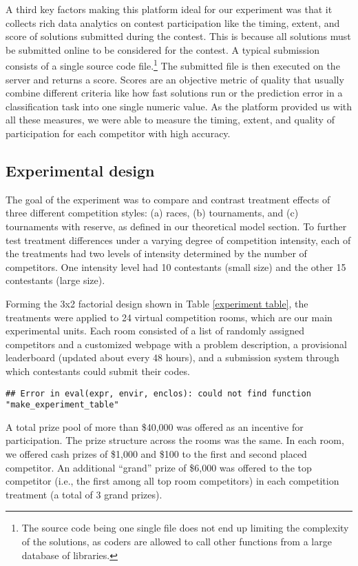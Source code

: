 \documentclass[11pt, titlepage]{article}
\begin{document}
A third key factors making this platform ideal for our experiment was
that it collects rich data analytics on contest participation like the
timing, extent, and score of solutions submitted during the contest.
This is because all solutions must be submitted online to be considered
for the contest. A typical submission consists of a single source code
file.\footnote{The source code being one single file does not end up
  limiting the complexity of the solutions, as coders are allowed to
  call other functions from a large database of libraries.} The
submitted file is then executed on the server and returns a score.
Scores are an objective metric of quality that usually combine different
criteria like how fast solutions run or the prediction error in a
classification task into one single numeric value. As the platform
provided us with all these measures, we were able to measure the timing,
extent, and quality of participation for each competitor with high
accuracy.

\subsection{Experimental design}\label{experimental-design}

The goal of the experiment was to compare and contrast treatment effects
of three different competition styles: (a) races, (b) tournaments, and
(c) tournaments with reserve, as defined in our theoretical model
section. To further test treatment differences under a varying degree of
competition intensity, each of the treatments had two levels of
intensity determined by the number of competitors. One intensity level
had 10 contestants (small size) and the other 15 contestants (large
size).

Forming the 3x2 factorial design shown in Table \ref{experiment table},
the treatments were applied to 24 virtual competition rooms, which are
our main experimental units. Each room consisted of a list of randomly
assigned competitors and a customized webpage with a problem
description, a provisional leaderboard (updated about every 48 hours),
and a submission system through which contestants could submit their
codes.

\begin{verbatim}
## Error in eval(expr, envir, enclos): could not find function "make_experiment_table"
\end{verbatim}

A total prize pool of more than \$40,000 was offered as an incentive for
participation. The prize structure across the rooms was the same. In
each room, we offered cash prizes of \$1,000 and \$100 to the first and
second placed competitor. An additional ``grand'' prize of \$6,000 was
offered to the top competitor (i.e., the first among all top room
competitors) in each competition treatment (a total of 3 grand prizes).
\end{document}
